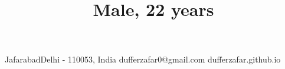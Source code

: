 \title{\normalsize Male, 22 years}

\address
    {H.No. 139, Street No. 7}{Jafarabad}{Delhi - 110053, India}
\email
    {dufferzafar0@gmail.com}
\homepage
    {dufferzafar.github.io}
